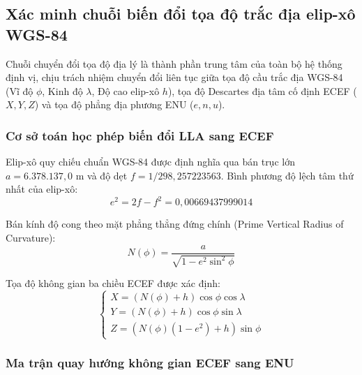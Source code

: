 \subsection{Xác minh chuỗi biến đổi tọa độ trắc địa elip-xô WGS-84}

\hspace{0.5cm} Chuỗi chuyển đổi tọa độ địa lý là thành phần trung tâm của toàn bộ hệ thống định vị, chịu trách nhiệm chuyển đổi liên tục giữa tọa độ cầu trắc địa WGS-84 (Vĩ độ $\phi$, Kinh độ $\lambda$, Độ cao elip-xô $h$), tọa độ Descartes địa tâm cố định ECEF ($X, Y, Z$) và tọa độ phẳng địa phương ENU ($e, n, u$).

\subsubsection{Cơ sở toán học phép biến đổi LLA sang ECEF}

\hspace{0.5cm} Elip-xô quy chiếu chuẩn WGS-84 được định nghĩa qua bán trục lớn $a = 6.378.137{,}0$ m và độ dẹt $f = 1 / 298{,}257223563$. Bình phương độ lệch tâm thứ nhất của elip-xô:
\begin{equation}
e^2 = 2f - f^2 = 0{,}00669437999014
\label{eq:first-eccentricity-squared}
\end{equation}

Bán kính độ cong theo mặt phẳng thẳng đứng chính (Prime Vertical Radius of Curvature):
\begin{equation}
N(\phi) = \frac{a}{\sqrt{1 - e^2 \sin^2\phi}}
\label{eq:prime-vertical-curvature}
\end{equation}

Tọa độ không gian ba chiều ECEF được xác định:
\begin{equation}
\begin{cases}
X = (N(\phi) + h) \cos\phi \cos\lambda \\
Y = (N(\phi) + h) \cos\phi \sin\lambda \\
Z = (N(\phi)(1 - e^2) + h) \sin\phi
\end{cases}
\label{eq:lla-to-ecef-direct-formula}
\end{equation}

\subsubsection{Ma trận quay hướng không gian ECEF sang ENU}

